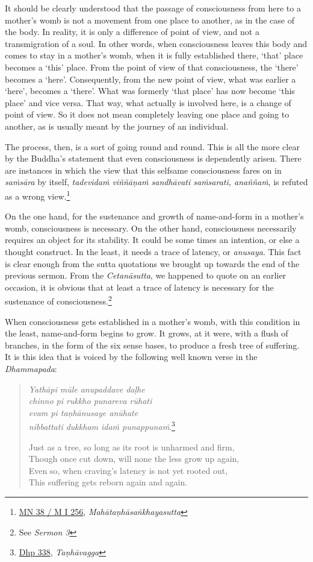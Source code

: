 It should be clearly understood that the passage of consciousness from here to a mother's womb is not a movement from one place to another, as in the case of the body. In reality, it is only a difference of point of view, and not a transmigration of a soul. In other words, when consciousness leaves this body and comes to stay in a mother's womb, when it is fully established there, `that' place becomes a `this' place. From the point of view of that consciousness, the `there' becomes a `here'. Consequently, from the new point of view, what was earlier a `here', becomes a `there'. What was formerly `that place' has now become `this place' and vice versa. That way, what actually is involved here, is a change of point of view. So it does not mean completely leaving one place and going to another, as is usually meant by the journey of an individual.

The process, then, is a sort of going round and round. This is all the more clear by the Buddha's statement that even consciousness is dependently arisen. There are instances in which the view that this selfsame consciousness fares on in \emph{saṁsāra} by itself, \emph{tadevidaṁ viññāṇaṁ sandhāvati saṁsarati, anaññaṁ}, is refuted as a wrong view.\footnote{\href{https://suttacentral.net/mn38/pli/ms}{MN 38 / M I 256}, \emph{Mahātaṇhāsaṅkhayasutta}}

On the one hand, for the sustenance and growth of name-and-form in a mother's womb, consciousness is necessary. On the other hand, consciousness necessarily requires an object for its stability. It could be some times an intention, or else a thought construct. In the least, it needs a trace of latency, or \emph{anusaya}. This fact is clear enough from the sutta quotations we brought up towards the end of the previous sermon. From the \emph{Cetanāsutta}, we happened to quote on an earlier occasion, it is obvious that at least a trace of latency is necessary for the sustenance of consciousness.\footnote{See \emph{Sermon 3}}

When consciousness gets established in a mother's womb, with this condition in the least, name-and-form begins to grow. It grows, at it were, with a flush of branches, in the form of the six sense bases, to produce a fresh tree of suffering. It is this idea that is voiced by the following well known verse in the \emph{Dhammapada}:

\begin{quote}
\emph{Yathāpi mūle anupaddave daḷhe}\\
\emph{chinno pi rukkho punareva rūhati}\\
\emph{evam pi taṇhānusaye anūhate}\\
\emph{nibbattati dukkham idaṁ punappunaṁ}.\footnote{\href{https://suttacentral.net/dhp334-359/pli/ms}{Dhp 338}, \emph{Taṇhāvagga}}

Just as a tree, so long as its root is unharmed and firm,\\
Though once cut down, will none the less grow up again,\\
Even so, when craving's latency is not yet rooted out,\\
This suffering gets reborn again and again.
\end{quote}

